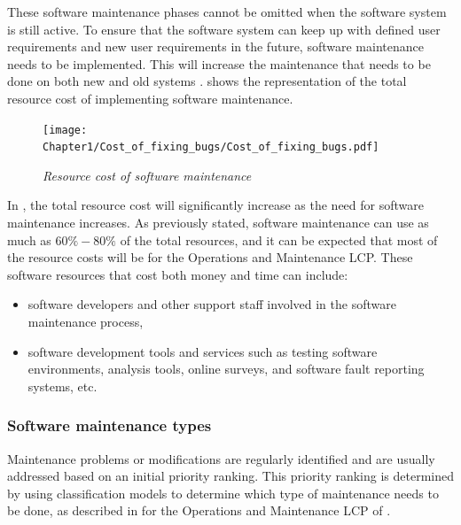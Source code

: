 These software maintenance phases cannot be omitted when the software system is still active. To ensure that the software system can keep up with defined user requirements and new user requirements in the future, software maintenance needs to be implemented. This will increase the maintenance that needs to be done on both new and old systems \cite{Niu2018, Galster2019, Hasan2012}.  shows the representation of the total resource cost of implementing software maintenance.

\begin{figure}[!htb]
	\centering %
	\texttt{[image: Chapter1/Cost\_of\_fixing\_bugs/Cost\_of\_fixing\_bugs.pdf]}
	\caption[Resource cost of software maintenance]
	{\textit{Resource cost of software maintenance \cite{Ogheneovo2014}}}\label{fig:ch1_costsOfFixingBugs}
\end{figure}

In , the total resource cost will significantly increase as the need for software maintenance increases. As previously stated, software maintenance can use as much as $60\%-80\%$ of the total resources, and it can be expected that most of the resource costs will be for the Operations and Maintenance LCP. These software resources that cost both money and time can include:

\begin{itemize}
	\item software developers and other support staff involved in the software maintenance process,
	\item software development tools and services such as testing software environments, analysis tools, online surveys, and software fault reporting systems, etc.
\end{itemize}

\subsubsection{Software maintenance types}

Maintenance problems or modifications are regularly identified and are usually addressed based on an initial priority ranking. This priority ranking is determined by using classification models to determine which type of maintenance needs to be done, as described in  for the Operations and Maintenance LCP of  \cite{Tang2010, Ping2010}.

